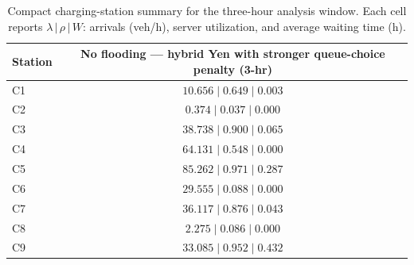 \begin{table}[h!]
\centering
\small
\setlength{\tabcolsep}{4pt}
\renewcommand{\arraystretch}{1.15}
\begin{tabular}{lc}
\toprule
Station & No flooding — hybrid Yen with stronger queue-choice penalty (3-hr) \\
\midrule
C1 & $10.656\;|\;0.649\;|\;0.003$ \\
C2 & $0.374\;|\;0.037\;|\;0.000$ \\
C3 & $38.738\;|\;0.900\;|\;0.065$ \\
C4 & $64.131\;|\;0.548\;|\;0.000$ \\
C5 & $85.262\;|\;0.971\;|\;0.287$ \\
C6 & $29.555\;|\;0.088\;|\;0.000$ \\
C7 & $36.117\;|\;0.876\;|\;0.043$ \\
C8 & $2.275\;|\;0.086\;|\;0.000$ \\
C9 & $33.085\;|\;0.952\;|\;0.432$ \\
\bottomrule
\end{tabular}
\caption{Compact charging-station summary for the three-hour analysis window. Each cell reports $\lambda\,|\,\rho\,|\,W$: arrivals (veh/h), server utilization, and average waiting time (h).}
\label{tab:chicago_no_flood_hybrid_tree_yen_stronger_queue_penalty_station_compact}
\end{table}
